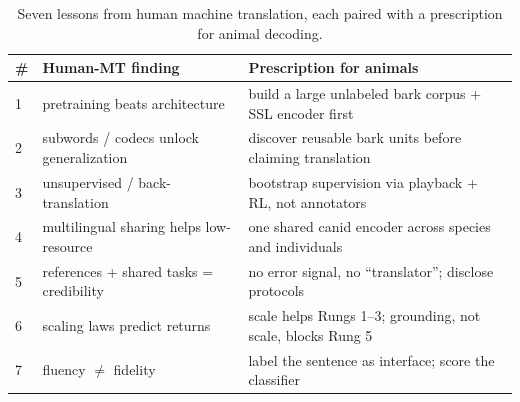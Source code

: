 \begin{table}[htbp]
\centering
\caption{Seven lessons from human machine translation, each paired with a
prescription for animal decoding.}
\label{tab:lessons}
\footnotesize
\setlength{\tabcolsep}{4pt}
\begin{tabular}{@{}p{0.6cm}p{4.7cm}p{8.0cm}@{}}
\toprule
\textbf{\#} & \textbf{Human-MT finding} & \textbf{Prescription for animals} \\
\midrule
1 & pretraining beats architecture~\cite{devlin2019bert,baevski2020wav2vec2} & build a large unlabeled bark corpus + SSL encoder first \\
2 & subwords / codecs unlock generalization~\cite{sennrich2016bpe,sharma2024whale} & discover reusable bark units before claiming translation \\
3 & unsupervised / back-translation~\cite{artetxe2018unsupervised,sennrich2016improving} & bootstrap supervision via playback + RL, not annotators \\
4 & multilingual sharing helps low-resource~\cite{costajussa2022nllb,johnson2017multilingual} & one shared canid encoder across species and individuals \\
5 & references + shared tasks = credibility~\cite{papineni2002bleu,bojar2018wmt} & no error signal, no ``translator''; disclose protocols \\
6 & scaling laws predict returns~\cite{kaplan2020scaling} & scale helps Rungs 1--3; grounding, not scale, blocks Rung 5 \\
7 & fluency $\neq$ fidelity~\cite{ji2023hallucination,maynez2020faithfulness} & label the sentence as interface; score the classifier \\
\bottomrule
\end{tabular}
\end{table}
